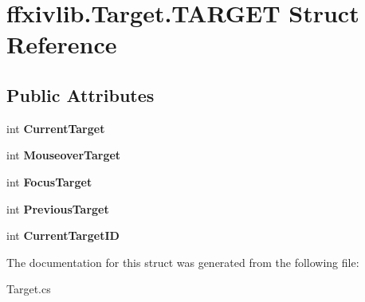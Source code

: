 \hypertarget{structffxivlib_1_1_target_1_1_t_a_r_g_e_t}{\section{ffxivlib.\-Target.\-T\-A\-R\-G\-E\-T Struct Reference}
\label{structffxivlib_1_1_target_1_1_t_a_r_g_e_t}
}
\subsection*{Public Attributes}
\begin{DoxyCompactItemize}
\item 
\hypertarget{structffxivlib_1_1_target_1_1_t_a_r_g_e_t_a09363b015f76f3fe6835f2329afa340d}{int {\bfseries Current\-Target}}\label{structffxivlib_1_1_target_1_1_t_a_r_g_e_t_a09363b015f76f3fe6835f2329afa340d}

\item 
\hypertarget{structffxivlib_1_1_target_1_1_t_a_r_g_e_t_a9ae0253a6651d33195eb2705ed72dbe7}{int {\bfseries Mouseover\-Target}}\label{structffxivlib_1_1_target_1_1_t_a_r_g_e_t_a9ae0253a6651d33195eb2705ed72dbe7}

\item 
\hypertarget{structffxivlib_1_1_target_1_1_t_a_r_g_e_t_a41d18413ff458102ffa918feb5b52cbe}{int {\bfseries Focus\-Target}}\label{structffxivlib_1_1_target_1_1_t_a_r_g_e_t_a41d18413ff458102ffa918feb5b52cbe}

\item 
\hypertarget{structffxivlib_1_1_target_1_1_t_a_r_g_e_t_a7efad8c4a75fbd1089826763551b63be}{int {\bfseries Previous\-Target}}\label{structffxivlib_1_1_target_1_1_t_a_r_g_e_t_a7efad8c4a75fbd1089826763551b63be}

\item 
\hypertarget{structffxivlib_1_1_target_1_1_t_a_r_g_e_t_a5966d34fa56acb18f67d364d8fb5d9d2}{int {\bfseries Current\-Target\-I\-D}}\label{structffxivlib_1_1_target_1_1_t_a_r_g_e_t_a5966d34fa56acb18f67d364d8fb5d9d2}

\end{DoxyCompactItemize}


The documentation for this struct was generated from the following file\-:\begin{DoxyCompactItemize}
\item 
Target.\-cs\end{DoxyCompactItemize}

